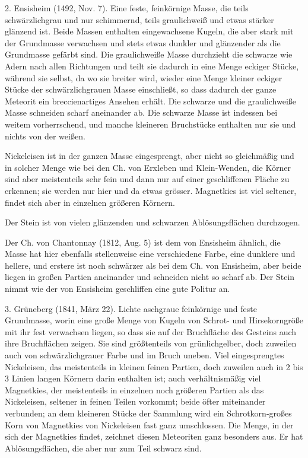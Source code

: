 \documentclass[a4paper, 11pt, oneside]{article}
\begin{document}
2. Ensisheim (1492, Nov. 7). Eine feste, feinkörnige Masse, die teils schwärzlichgrau und nur schimmernd, teils graulichweiß und etwas stärker glänzend ist. Beide Massen enthalten eingewachsene Kugeln, die aber stark mit der Grundmasse verwachsen und stets etwas dunkler und glänzender als die Grundmasse gefärbt sind. Die graulichweiße Masse durchzieht die schwarze wie Adern nach allen Richtungen und teilt sie dadurch in eine Menge eckiger Stücke, während sie selbst, da wo sie breiter wird, wieder eine Menge kleiner eckiger Stücke der schwärzlichgrauen Masse einschließt, so dass dadurch der ganze Meteorit ein breccienartiges Ansehen erhält. Die schwarze und die graulichweiße Masse schneiden scharf aneinander ab. Die schwarze Masse ist indessen bei weitem vorherrschend, und manche kleineren Bruchstücke enthalten nur sie und nichts von der weißen.

Nickeleisen ist in der ganzen Masse eingesprengt, aber nicht so gleichmäßig und in solcher Menge wie bei den Ch. von Erxleben und Klein-Wenden, die Körner sind aber meistenteils sehr fein und dann nur auf einer geschliffenen Fläche zu erkennen; sie werden nur hier und da etwas grösser. Magnetkies ist viel seltener, findet sich aber in einzelnen größeren Körnern.

Der Stein ist von vielen glänzenden und schwarzen Ablösungsflächen durchzogen.

Der Ch. von Chantonnay (1812, Aug. 5) ist dem von Ensisheim ähnlich, die Masse hat hier ebenfalls stellenweise eine verschiedene Farbe, eine dunklere und hellere, und erstere ist noch schwärzer als bei dem Ch. von Ensisheim, aber beide liegen in großen Partien aneinander und schneiden nicht so scharf ab. Der Stein nimmt wie der von Ensisheim geschliffen eine gute Politur an.

3. Grüneberg (1841, März 22). Lichte aschgraue feinkörnige und feste Grundmasse, worin eine große Menge von Kugeln von Schrot- und Hirsekorngröße mit ihr fest verwachsen liegen, so dass sie auf der Bruchfläche des Gesteins auch ihre Bruchflächen zeigen. Sie sind größtenteils von grünlichgelber, doch zuweilen auch von schwärzlichgrauer Farbe und im Bruch uneben. Viel eingesprengtes Nickeleisen, das meistenteils in kleinen feinen Partien, doch zuweilen auch in 2 bis 3 Linien langen Körnern darin enthalten ist; auch verhältnismäßig viel Magnetkies, der meistenteils in einzelnen noch größeren Partien als das Nickeleisen, seltener in feinen Teilen vorkommt; beide öfter miteinander verbunden; an dem kleineren Stücke der Sammlung wird ein Schrotkorn-großes Korn von Magnetkies von Nickeleisen fast ganz umschlossen. Die Menge, in der sich der Magnetkies findet, zeichnet diesen Meteoriten ganz besonders aus. Er hat Ablösungsflächen, die aber nur zum Teil schwarz sind.
\end{document}

